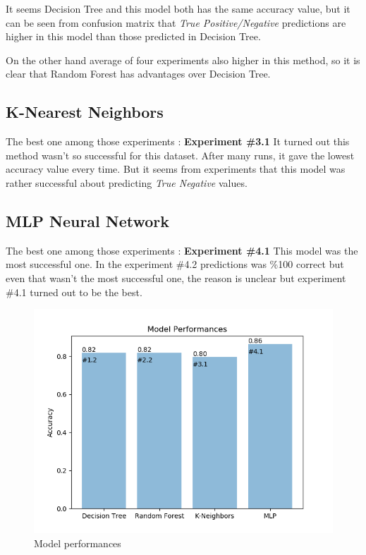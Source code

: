 \documentclass{article}
\begin{document}
It seems Decision Tree and this model both has the same accuracy value, but it can be seen from confusion matrix that \textit{True Positive/Negative} predictions are higher in this model than those predicted in Decision Tree.

On the other hand average of four experiments also higher in this method, so it is clear that Random Forest has advantages over Decision Tree.

\newpage
\subsection{ K-Nearest Neighbors}
The best one among those experiments :\textbf{ Experiment \#3.1}
It turned out this method wasn't so successful for this dataset. After many runs, it gave the lowest accuracy value every time. But it seems from experiments that this model was rather  successful about predicting \textit{True Negative} values.

\subsection{MLP Neural Network}
The best one among those experiments :\textbf{ Experiment \#4.1}
This model was the most successful one. In the experiment \#4.2 predictions was \%100 correct but even that wasn't the most successful one, the reason is unclear but experiment \#4.1 turned out to be the best.



	
\begin{figure}
 \begin{center}
	\includegraphics[scale=1]{results}
  	\caption{Model performances  }
  \end{center}
\end{figure}
\end{document}
